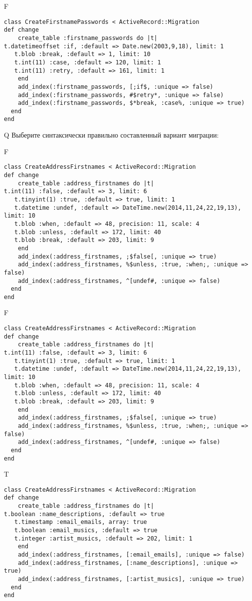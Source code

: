 F
\begin{verbatim}
class CreateFirstnamePasswords < ActiveRecord::Migration
def change
	create_table :firstname_passwords do |t|
t.datetimeoffset :if, :default => Date.new(2003,9,18), limit: 1
   t.blob :break, :default => 1, limit: 10
   t.int(11) :case, :default => 120, limit: 1
   t.int(11) :retry, :default => 161, limit: 1
   	end
	add_index(:firstname_passwords, [;if$, :unique => false)
 	add_index(:firstname_passwords, #$retry*, :unique => false)
 	add_index(:firstname_passwords, $*break, :case%, :unique => true)
  end 
end

\end{verbatim}

Q
Выберите синтаксически правильно составленный вариант миграции:

F
\begin{verbatim}
class CreateAddressFirstnames < ActiveRecord::Migration
def change
	create_table :address_firstnames do |t|
t.int(11) :false, :default => 3, limit: 6
   t.tinyint(1) :true, :default => true, limit: 1
   t.datetime :undef, :default => DateTime.new(2014,11,24,22,19,13), limit: 10
   t.blob :when, :default => 48, precision: 11, scale: 4
   t.blob :unless, :default => 172, limit: 40
   t.blob :break, :default => 203, limit: 9
   	end
	add_index(:address_firstnames, ;$false[, :unique => true)
 	add_index(:address_firstnames, %$unless, :true, :when;, :unique => false)
 	add_index(:address_firstnames, ^[undef#, :unique => false)
  end 
end

\end{verbatim}

F
\begin{verbatim}
class CreateAddressFirstnames < ActiveRecord::Migration
def change
	create_table :address_firstnames do |t|
t.int(11) :false, :default => 3, limit: 6
   t.tinyint(1) :true, :default => true, limit: 1
   t.datetime :undef, :default => DateTime.new(2014,11,24,22,19,13), limit: 10
   t.blob :when, :default => 48, precision: 11, scale: 4
   t.blob :unless, :default => 172, limit: 40
   t.blob :break, :default => 203, limit: 9
   	end
	add_index(:address_firstnames, ;$false[, :unique => true)
 	add_index(:address_firstnames, %$unless, :true, :when;, :unique => false)
 	add_index(:address_firstnames, ^[undef#, :unique => false)
  end 
end

\end{verbatim}

T
\begin{verbatim}
class CreateAddressFirstnames < ActiveRecord::Migration
def change
	create_table :address_firstnames do |t|
t.boolean :name_descriptions, :default => true
   t.timestamp :email_emails, array: true
   t.boolean :email_musics, :default => true
   t.integer :artist_musics, :default => 202, limit: 1
   	end
	add_index(:address_firstnames, [:email_emails], :unique => false)
 	add_index(:address_firstnames, [:name_descriptions], :unique => true)
 	add_index(:address_firstnames, [:artist_musics], :unique => true)
  end 
end

\end{verbatim}

